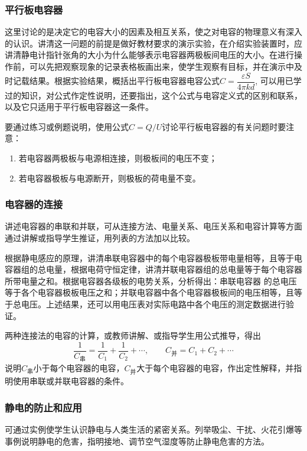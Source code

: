 \subsubsection{平行板电容器}

这里讨论的是决定它的电容大小的因素及相互关系，使之对电容的物理意义有深入的认识。讲清这一问题的前提是做好教材要求的演示实验，在介绍实验装置时，应讲清静电计指针张角的大小为什么能够表示电容器两极板间电压的大小。在进行操作前，可以先把观察现象的记录表格板画出来，使学生观察有目标，并在演示中及时记载结果。根据实验结果，概括出平行板电容器电容公式$C=\dfrac{\varepsilon S}{4\pi kd}$, 可以用已学过的知识，对公式作定性说明，还要指出，这个公式与电容定义式的区别和联系，以及它只适用于平行板电容器这一条件。

要通过练习或例题说明，使用公式$C=Q/U$讨论平行板电容器的有关问题时要注意：
\begin{enumerate}
    \item 若电容器两极板与电源相连接，则极板间的电压不变；
    \item 若电容器极板与电源断开，则极板的荷电量不变。
\end{enumerate}



\subsubsection{电容器的连接}

讲述电容器的串联和并联，可从连接方法、电量关系、电压关系和电容计算等方面通过讲解或指导学生推证，用列表的方法加以比较。

根据静电感应的原理，讲清串联电容器中的每个电容器极板带电量相等，且等于电容器组的总电量，根据电荷守恒定律，讲清并联电容器组的总电量等于每个电容器所带电量之和。根据电容器各级板的电势关系，分析得出：串联电容器
的总电压等于各个电容器极板电压之和；并联电容器中各个电容器极板间的电压相等，且等于总电压。上述结果，还可以用电压表对实际电路中各个电压的测定数据进行验证。

两种连接法的电容的计算，或教师讲解、或指导学生用公式推导，得出
\[\frac{1}{C_{\text{串}}}=\frac{1}{C_1}+\frac{1}{C_2}+\cdots,\qquad C_{\text{并}}=C_1+C_2+\cdots\]
说明$C_{\text{串}}$小于每个电容器的电容，$C_{\text{并}}$大于每个电容器的电容，作出定性解释，并指明使用串联或并联电容器的条件。

\subsubsection{静电的防止和应用}

可通过实例使学生认识静电与人类生活的紧密关系。列举吸尘、干扰、火花引爆等事例说明静电的危害，指明接地、调节空气湿度等防止静电危害的方法。


